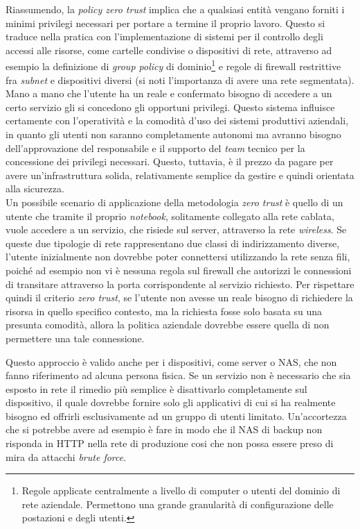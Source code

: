 \documentclass[target=bach,aauheader=]{thud}
\begin{document}
Riassumendo, la \textit{policy zero trust} implica che a qualsiasi entità vengano forniti i minimi privilegi necessari per portare a termine il proprio lavoro. Questo si traduce nella pratica con l'implementazione di sistemi per il controllo degli accessi alle risorse, come cartelle condivise o dispositivi di rete, attraverso ad esempio la definizione di \textit{group policy} di dominio\footnote{Regole applicate centralmente a livello di computer o utenti del dominio di rete aziendale. Permettono una grande granularità di configurazione delle postazioni e degli utenti.} e regole di firewall restrittive fra \textit{subnet} e dispositivi diversi (si noti l'importanza di avere una rete segmentata). Mano a mano che l'utente ha un reale e confermato bisogno di accedere a un certo servizio gli si concedono gli opportuni privilegi. Questo sistema influisce certamente con l'operatività e la comodità d'uso dei sistemi produttivi aziendali, in quanto gli utenti non saranno completamente autonomi ma avranno bisogno dell'approvazione del responsabile e il supporto del \textit{team} tecnico per la concessione dei privilegi necessari. Questo, tuttavia, è il prezzo da pagare per avere un'infrastruttura solida, relativamente semplice da gestire e quindi orientata alla sicurezza.
\\ Un possibile scenario di applicazione della metodologia \textit{zero trust} è quello di un utente che tramite il proprio \textit{notebook}, solitamente collegato alla rete cablata, vuole accedere a un servizio, che risiede sul server, attraverso la rete \textit{wireless}. Se queste due tipologie di rete rappresentano due classi di indirizzamento diverse, l'utente inizialmente non dovrebbe poter connettersi utilizzando la rete senza fili, poiché ad esempio non vi è nessuna regola sul firewall che autorizzi le connessioni di transitare attraverso la porta corrispondente al servizio richiesto. Per rispettare quindi il criterio \textit{zero trust}, se l'utente non avesse un reale bisogno di richiedere la risorsa in quello specifico contesto, ma la richiesta fosse solo basata su una presunta comodità, allora la politica aziendale dovrebbe essere quella di non permettere una tale connessione.

Questo approccio è valido anche per i dispositivi, come server o NAS, che non fanno riferimento ad alcuna persona fisica. Se un servizio non è necessario che sia esposto in rete il rimedio più semplice è disattivarlo completamente sul dispositivo, il quale dovrebbe fornire solo gli applicativi di cui si ha realmente bisogno ed offrirli esclusivamente ad un gruppo di utenti limitato. Un'accortezza che si potrebbe avere ad esempio è fare in modo che il NAS di backup non risponda in HTTP nella rete di produzione cosi che non possa essere preso di mira da attacchi \textit{brute force}.
\end{document}
